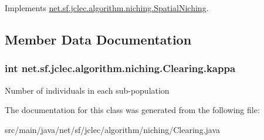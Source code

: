 Implements \hyperlink{classnet_1_1sf_1_1jclec_1_1algorithm_1_1niching_1_1_spatial_niching_aa0d6ea4c17a680c3beab861e17232af1}{net.\-sf.\-jclec.\-algorithm.\-niching.\-Spatial\-Niching}.



\subsection{Member Data Documentation}
\hypertarget{classnet_1_1sf_1_1jclec_1_1algorithm_1_1niching_1_1_clearing_a8702bf03f3e04215d9ea14fb792def04}{
\subsubsection[{kappa}]{\setlength{\rightskip}{0pt plus 5cm}int net.\-sf.\-jclec.\-algorithm.\-niching.\-Clearing.\-kappa\hspace{0.3cm}{\ttfamily [protected]}}}\label{classnet_1_1sf_1_1jclec_1_1algorithm_1_1niching_1_1_clearing_a8702bf03f3e04215d9ea14fb792def04}
Number of individuals in each sub-\/population 

The documentation for this class was generated from the following file\-:\begin{DoxyCompactItemize}
\item 
src/main/java/net/sf/jclec/algorithm/niching/Clearing.\-java\end{DoxyCompactItemize}

